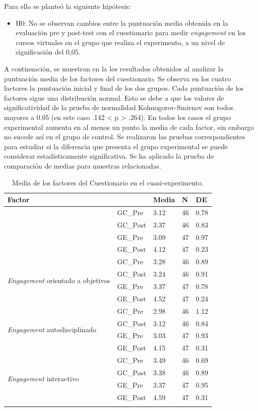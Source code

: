 \documentclass{textolivre}
\begin{document}
Para ello se planteó la siguiente hipótesis:
\begin{itemize}
    \item H0: No se observan cambios entre la puntuación media obtenida en la evaluación pre y post-test con el cuestionario para medir \emph{engagement} en los cursos virtuales en el grupo que realiza el experimento, a un nivel de significación del 0,05.
\end{itemize}

A continuación, se muestran en la  los resultados obtenidos al analizar la puntuación media de los factores del cuestionario. Se observa en los cuatro factores la puntuación inicial y final de los dos grupos. Cada puntuación de los factores sigue una distribución normal. Esto se debe a que los valores de significatividad de la prueba de normalidad Kolmogorov-Smirnov son todos mayores a 0.05 (en este caso .142 < p > .264). En todos los casos el grupo experimental aumenta en al menos un punto la media de cada factor, sin embargo no sucede así en el grupo de control. Se realizaron las pruebas correspondientes para estudiar si la diferencia que presenta el grupo experimental se puede considerar estadísticamente significativa. Se ha aplicado la prueba de comparación de medias para muestras relacionadas.

\begin{table}[htbp]
\caption{Media de los factores del Cuestionario en el cuasi-experimento.}
\label{tab3}
\centering
\begin{tabular}{lllll}
\toprule
Factor &  & Media & N & DE \\ 
\midrule
\arrayrulecolor[gray]{.7}
\multirow{4}{*}{\emph{Engagement} aplicado} & GC\_Pre & 3.12 & 46 & 0.78 \\
 & GC\_Post & 3.37 & 46 & 0.83 \\
 \cmidrule{2-5}
 & GE\_Pre & 3.09 & 47 & 0.97 \\
 & GE\_Post & 4.12 & 47 & 0.23 \\
\midrule
\multirow{4}{*}{\emph{Engagement} orientado a objetivos} & GC\_Pre & 3.28 & 46 & 0.89 \\
 & GC\_Post & 3.24 & 46 & 0.91 \\
 \cmidrule{2-5}
 & GE\_Pre & 3.37 & 47 & 0.78 \\
 & GE\_Post & 4.52 & 47 & 0.24 \\
\midrule
\multirow{4}{*}{\emph{Engagement} autodisciplinado} & GC\_Pre & 2.98 & 46 & 1.12 \\
 & GC\_Post & 3.12 & 46 & 0.84 \\
 \cmidrule{2-5}
 & GE\_Pre & 3.03 & 47 & 0.93 \\
 & GE\_Post & 4.15 & 47 & 0.31 \\
\midrule
\multirow{4}{*}{\emph{Engagement} interactivo} & GC\_Pre & 3.49 & 46 & 0.69 \\
 & GC\_Post & 3.38 & 46 & 0.89 \\
 \cmidrule{2-5}
 & GE\_Pre & 3.37 & 47 & 0.95 \\
 & GE\_Post & 4.59 & 47 & 0.31 \\
\arrayrulecolor{black}
\bottomrule
\end{tabular}
\end{table}
\end{document}
